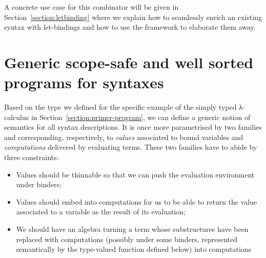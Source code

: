 

A concrete use case for this combinator will be given in
Section~\ref{section:letbinding}
where we explain how to seamlessly enrich an existing syntax with let-bindings
and how to use the \semrec{} framework to elaborate them away.




\section{Generic scope-safe and well sorted programs for syntaxes}\label{section:semantics}

Based on the \semrec{} type we defined for the specific example of the
simply typed λ-calculus in Section~\ref{section:primer-program},
we can define a generic notion of
semantics for all syntax descriptions. It is once more parametrised
by two  families  and  corresponding,
respectively, to \emph{values} associated to bound variables and
\emph{computations} delivered by evaluating terms. These two families
have to abide by three constraints:
\begin{itemize}
\item{} Values should be thinnable so that we can push the
      evaluation environment under binders;
\item{} Values should embed into computations for us to be able
      to return the value associated to a variable as the
      result of its evaluation;
\item{} We should have an algebra turning
      a term whose substructures have been replaced with
      computations (possibly under some binders, represented semantically
      by the  type-valued function defined below) into computations
\end{itemize}

